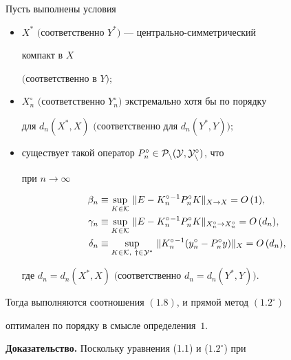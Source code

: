 \begin{thms}


Пусть выполнены условия


\begin{itemize}


\item[а)] $X^*$ $($соответственно $Y^*)$ --- центрально-симметрический


компакт в $X$


$($соот\-вет\-ст\-вен\-но в $Y);$


\item[б)] $X_n^\circ$ $($соответственно $Y_n^\circ )$ экстремально хотя бы по порядку


для $d_n(X^*,X)$ $($соот\-вет\-ст\-вен\-но для $d_n(Y^*,Y));$


\item[в)] существует такой оператор $P_n^\circ\in \cal P_n(Y,Y_n^\circ)$, что


при $n\rightarrow \infty$


\begin{align*}


\beta_n&\equiv \sup_{K\in \cal K}\, \|E-K_n^\circ{}^{-1}P_n^\circ K\|


_{X\rightarrow X}=O\, (1), \\


%


\gamma_n&\equiv \sup_{K\in \cal K}\, \|E-K_n^\circ{}^{-1}P_n^\circ K\|


_{X_n^\circ \rightarrow X_n^\circ }=O\, (d_n), \\


%


\delta_n&\equiv \sup_{K\in \cal K,\ y\in Y^*}\, \|K_n^\circ{}^{-1}


(y_n^\circ -P_n^\circ y)\|_X =O\, (d_n),


\end{align*}


где $d_n=d_n(X^*,X)$ $($соответственно $d_n=d_n(Y^*,Y))$.


\end{itemize}


Тогда выполняются соотношения $(1.8)$, и прямой метод $(1.2^\circ)$


оптимален по порядку в смысле определения~$1$.


\end{thms}





{\bf Доказательство.} Поскольку уравнения (1.1) и ($1.2^\circ $) при


